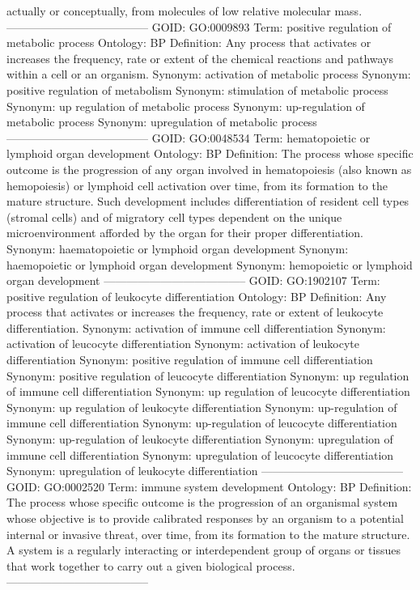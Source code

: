 \documentclass[a4paper,11pt]{article}
\begin{document}
\begin{Schunk}
\begin{Soutput}
    actually or conceptually, from molecules of low relative molecular
    mass.
--------------------------------------
GOID: GO:0009893
Term: positive regulation of metabolic process
Ontology: BP
Definition: Any process that activates or increases the frequency, rate
    or extent of the chemical reactions and pathways within a cell or
    an organism.
Synonym: activation of metabolic process
Synonym: positive regulation of metabolism
Synonym: stimulation of metabolic process
Synonym: up regulation of metabolic process
Synonym: up-regulation of metabolic process
Synonym: upregulation of metabolic process
--------------------------------------
GOID: GO:0048534
Term: hematopoietic or lymphoid organ development
Ontology: BP
Definition: The process whose specific outcome is the progression of
    any organ involved in hematopoiesis (also known as hemopoiesis) or
    lymphoid cell activation over time, from its formation to the
    mature structure. Such development includes differentiation of
    resident cell types (stromal cells) and of migratory cell types
    dependent on the unique microenvironment afforded by the organ for
    their proper differentiation.
Synonym: haematopoietic or lymphoid organ development
Synonym: haemopoietic or lymphoid organ development
Synonym: hemopoietic or lymphoid organ development
--------------------------------------
GOID: GO:1902107
Term: positive regulation of leukocyte differentiation
Ontology: BP
Definition: Any process that activates or increases the frequency, rate
    or extent of leukocyte differentiation.
Synonym: activation of immune cell differentiation
Synonym: activation of leucocyte differentiation
Synonym: activation of leukocyte differentiation
Synonym: positive regulation of immune cell differentiation
Synonym: positive regulation of leucocyte differentiation
Synonym: up regulation of immune cell differentiation
Synonym: up regulation of leucocyte differentiation
Synonym: up regulation of leukocyte differentiation
Synonym: up-regulation of immune cell differentiation
Synonym: up-regulation of leucocyte differentiation
Synonym: up-regulation of leukocyte differentiation
Synonym: upregulation of immune cell differentiation
Synonym: upregulation of leucocyte differentiation
Synonym: upregulation of leukocyte differentiation
--------------------------------------
GOID: GO:0002520
Term: immune system development
Ontology: BP
Definition: The process whose specific outcome is the progression of an
    organismal system whose objective is to provide calibrated
    responses by an organism to a potential internal or invasive
    threat, over time, from its formation to the mature structure. A
    system is a regularly interacting or interdependent group of organs
    or tissues that work together to carry out a given biological
    process.
--------------------------------------
\end{Soutput}
\end{Schunk}
\end{document}
